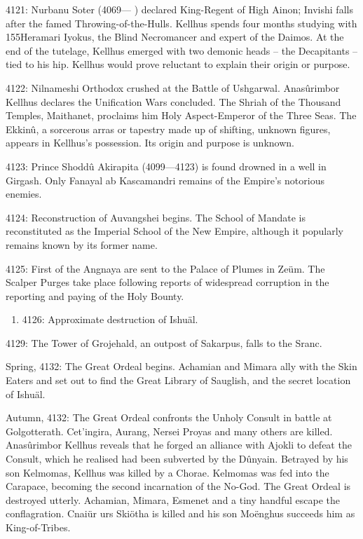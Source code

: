 \documentclass[]{book}
\providecommand{\tightlist}{%
  \setlength{\itemsep}{0pt}\setlength{\parskip}{0pt}}
\begin{document}
4121: Nurbanu Soter (4069--- ) declared King-Regent of High Ainon; Invishi falls after
the famed Throwing-of-the-Hulls. Kellhus spends four months studying with
155Heramari Iyokus, the Blind Necromancer and expert of the Daimos. At the end
of the tutelage, Kellhus emerged with two demonic heads -- the Decapitants --
tied to his hip. Kellhus would prove reluctant to explain their origin or purpose.

4122: Nilnameshi Orthodox crushed at the Battle of Ushgarwal. Anasûrimbor Kellhus
declares the Unification Wars concluded. The Shriah of the Thousand
Temples, Maithanet, proclaims him Holy Aspect-Emperor of the Three Seas.
The Ekkinû, a sorcerous arras or tapestry made up of shifting, unknown figures,
appears in Kellhus's possession. Its origin and purpose is unknown.

4123: Prince Shoddû Akirapita (4099---4123) is found drowned in a well in Girgash.
Only Fanayal ab Kascamandri remains of the Empire's notorious enemies.

4124: Reconstruction of Auvangshei begins. The School of Mandate is reconstituted
as the Imperial School of the New Empire, although it popularly remains
known by its former name.

4125: First of the Angnaya are sent to the Palace of Plumes in Zeüm. The Scalper
Purges take place following reports of widespread corruption in the reporting
and paying of the Holy Bounty.

\begin{enumerate}
\def\labelenumi{\alph{enumi}.}
\setcounter{enumi}{2}
\tightlist
\item
  4126: Approximate destruction of Ishuäl.
\end{enumerate}

4129: The Tower of Grojehald, an outpost of Sakarpus, falls to the Sranc.

Spring, 4132: The Great Ordeal begins. Achamian and Mimara ally with the Skin
Eaters and set out to find the Great Library of Sauglish, and the secret location
of Ishuäl.

Autumn, 4132: The Great Ordeal confronts the Unholy Consult in battle at
Golgotterath. Cet'ingira, Aurang, Nersei Proyas and many others are killed.
Anasûrimbor Kellhus reveals that he forged an alliance with Ajokli to defeat the
Consult, which he realised had been subverted by the Dûnyain. Betrayed by his
son Kelmomas, Kellhus was killed by a Chorae. Kelmomas was fed into the
Carapace, becoming the second incarnation of the No-God. The Great Ordeal
is destroyed utterly. Achamian, Mimara, Esmenet and a tiny handful escape the
conflagration. Cnaiür urs Skiötha is killed and his son Moënghus succeeds him
as King-of-Tribes.
\end{document}
